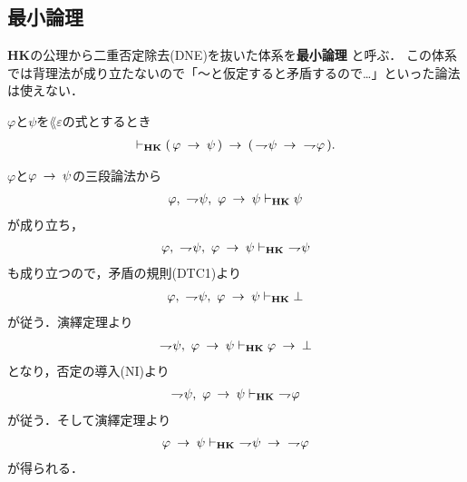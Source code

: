 \subsection{最小論理}
	{\bf HK}の公理から二重否定除去(DNE)を抜いた体系を{\bf 最小論理}
	と呼ぶ．
	この体系では背理法が成り立たないので「～と仮定すると矛盾するので…」といった論法は使えない．
	
	\begin{screen}
		\begin{thm}[対偶律$1$]\label{classic:contraposition_1}
			$\varphi$と$\psi$を$\lang{\varepsilon}$の式とするとき
			\begin{align}
				\vdash_{{\scriptsize \mbox{{\bf HK}}}} (\, \varphi \hspace{0.25em}\rightarrow\hspace{0.25em} \psi\, )
				\hspace{0.25em}\rightarrow\hspace{0.25em} (\, \rightharpoondown\hspace{-0.25em} \psi \hspace{0.25em}\rightarrow\hspace{0.25em}\ \rightharpoondown\hspace{-0.25em} \varphi\, ).
			\end{align}
		\end{thm}
	\end{screen}
	
	\begin{sketch}
		$\varphi$と$\varphi \hspace{0.25em}\rightarrow\hspace{0.25em} \psi$の三段論法から
		\begin{align}
			\varphi,\ \rightharpoondown\hspace{-0.25em} \psi,\ \varphi \hspace{0.25em}\rightarrow\hspace{0.25em} \psi
			\vdash_{{\scriptsize \mbox{{\bf HK}}}} \psi
		\end{align}
		が成り立ち，
		\begin{align}
			\varphi,\ \rightharpoondown\hspace{-0.25em} \psi,\ \varphi \hspace{0.25em}\rightarrow\hspace{0.25em} \psi
			\vdash_{{\scriptsize \mbox{{\bf HK}}}}\ \rightharpoondown\hspace{-0.25em} \psi
		\end{align}
		も成り立つので，矛盾の規則(DTC1)より
		\begin{align}
			\varphi,\ \rightharpoondown\hspace{-0.25em} \psi,\ \varphi \hspace{0.25em}\rightarrow\hspace{0.25em} \psi
			\vdash_{{\scriptsize \mbox{{\bf HK}}}} \bot
		\end{align}
		が従う．演繹定理より
		\begin{align}
			\rightharpoondown\hspace{-0.25em} \psi,\ \varphi \hspace{0.25em}\rightarrow\hspace{0.25em} \psi
			\vdash_{{\scriptsize \mbox{{\bf HK}}}} \varphi \hspace{0.25em}\rightarrow\hspace{0.25em} \bot
		\end{align}
		となり，否定の導入(NI)より
		\begin{align}
			\rightharpoondown\hspace{-0.25em} \psi,\ \varphi \hspace{0.25em}\rightarrow\hspace{0.25em} \psi
			\vdash_{{\scriptsize \mbox{{\bf HK}}}}\ \rightharpoondown\hspace{-0.25em} \varphi
		\end{align}
		が従う．そして演繹定理より
		\begin{align}
			\varphi \rarrow \psi
			\provable{\mbox{{\bf HK}}}\ \negation \psi \rarrow\ \negation \varphi
		\end{align}
		が得られる．
		\QED
	\end{sketch}
	
